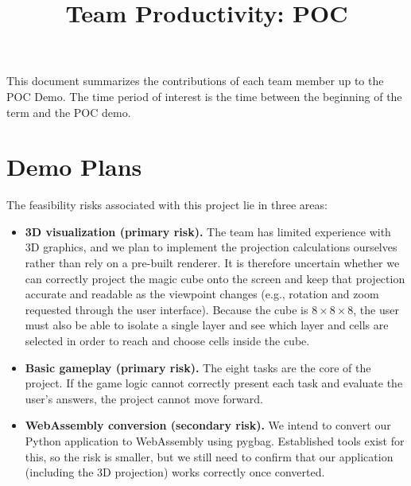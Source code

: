 \documentclass{article}
\title{Team Productivity: POC\\\progname}
\author{\authname}
\date{}
\begin{document}
\maketitle

This document summarizes the contributions of each team member up to the POC
Demo.  The time period of interest is the time between the beginning of the term
and the POC demo.




\section{Demo Plans}



The feasibility risks associated with this project lie in three areas:

\begin{itemize}
  \item \textbf{3D visualization (primary risk).} The team has limited experience
  with 3D graphics, and we plan to implement the projection calculations ourselves
  rather than rely on a pre-built renderer. It is therefore uncertain whether we
  can correctly project the magic cube onto the screen and keep that projection
  accurate and readable as the viewpoint changes (e.g., rotation and zoom
  requested through the user interface). Because the cube is $8\times8\times8$,
  the user must also be able to isolate a single layer and see which layer and
  cells are selected in order to reach and choose cells inside the cube.
  \item \textbf{Basic gameplay (primary risk).} The eight tasks are the core of the
  project. If the game logic cannot correctly present each task and evaluate the
  user's answers, the project cannot move forward.
  \item \textbf{WebAssembly conversion (secondary risk).} We intend to convert our
  Python application to WebAssembly using pygbag. Established tools exist for
  this, so the risk is smaller, but we still need to confirm that our application
  (including the 3D projection) works correctly once converted.
\end{itemize}
\end{document}
